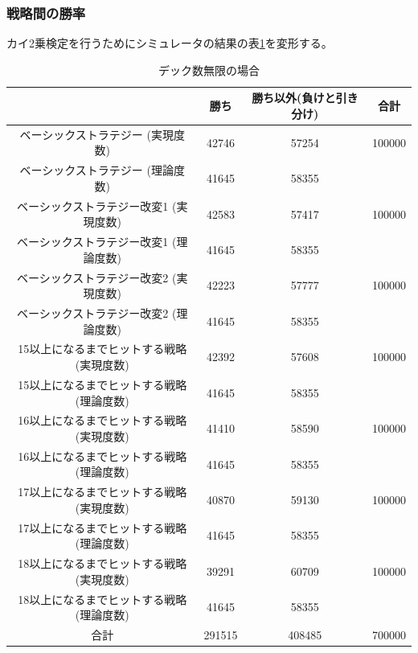 \subsubsection{戦略間の勝率}
カイ2乗検定を行うためにシミュレータの結果の表\ref{kaiinf}を変形する。
\begin{table}[H]
 \caption{デック数無限の場合\label{kaiinf}}
 \begin{center}
  \begin{tabular}{|c|c|c|c|}
    \hline  & 勝ち & 勝ち以外(負けと引き分け) & 合計 \\
    \hline ベーシックストラテジー (実現度数)& 42746 & 57254 & 100000 \\
             ベーシックストラテジー (理論度数)& 41645 & 58355 &  \\
    \hline ベーシックストラテジー改変1 (実現度数)& 42583 & 57417 & 100000 \\
             ベーシックストラテジー改変1 (理論度数)& 41645 & 58355 &  \\
    \hline ベーシックストラテジー改変2 (実現度数)& 42223 & 57777 & 100000 \\
              ベーシックストラテジー改変2 (理論度数)& 41645 & 58355 &  \\
    \hline 15以上になるまでヒットする戦略 (実現度数)& 42392 & 57608 & 100000 \\
             15以上になるまでヒットする戦略 (理論度数)& 41645 & 58355 & 　\\
    \hline 16以上になるまでヒットする戦略 (実現度数)& 41410 & 58590 & 100000 \\
             16以上になるまでヒットする戦略 (理論度数)& 41645 & 58355 & 　\\
    \hline 17以上になるまでヒットする戦略 (実現度数)& 40870 & 59130 & 100000 \\
             17以上になるまでヒットする戦略 (理論度数)& 41645 & 58355 & 　\\
    \hline 18以上になるまでヒットする戦略 (実現度数)& 39291 & 60709 & 100000 \\
             18以上になるまでヒットする戦略 (理論度数)& 41645 & 58355 & 　\\
    \hline  合計 & 291515 & 408485 & 700000 \\
    \hline
  \end{tabular}
 \end{center}
\end{table}
